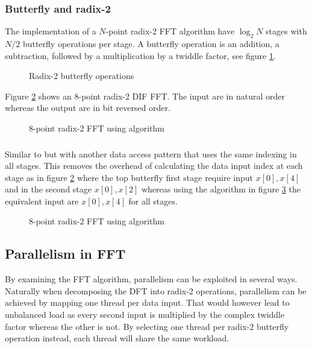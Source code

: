 \subsubsection{Butterfly and radix-2}

The implementation of a $N$-point radix-2 FFT algorithm have $\log_2{N}$ stages with $N/2$ butterfly operations per stage. A butterfly operation is an addition, a subtraction, followed by a multiplication by a twiddle factor, see figure \ref{fig:butterfly}.

\begin{figure}
	\centering
	
	\caption{Radix-2 butterfly operations}
	\label{fig:butterfly}
\end{figure}

Figure \ref{fig:cooley-tukey-8} shows an 8-point radix-2 DIF FFT. The input are in natural order whereas the output are in bit reversed order.

\begin{figure}
	\centering
	
	\caption{8-point radix-2 FFT using {\CTALG} algorithm}
	\label{fig:cooley-tukey-8}
\end{figure}

\subsubsection{\CGALG}

Similar to {\CTALG} but with another data access pattern that uses the same indexing in all stages. This removes the overhead of calculating the data input index at each stage as in figure \ref{fig:cooley-tukey-8} where the top butterfly first stage require input $x[0], x[4]$ and in the second stage $x[0], x[2]$ whereas using the {\CGALG} algorithm in figure \ref{fig:constant-geometry-8} the equivalent input are $x[0], x[4]$ for all stages.

\begin{figure}
	\centering
	
	\caption{8-point radix-2 FFT using {\CGALG} algorithm}
	\label{fig:constant-geometry-8}
\end{figure}

\subsection{Parallelism in FFT}

By examining the FFT algorithm, parallelism can be exploited in several ways. Naturally when decomposing the DFT into radix-2 operations, parallelism can be achieved by mapping one thread per data input. That would however lead to unbalanced load as every second input is multiplied by the complex twiddle factor whereas the other is not. By selecting one thread per radix-2 butterfly operation instead, each thread will share the same workload.

